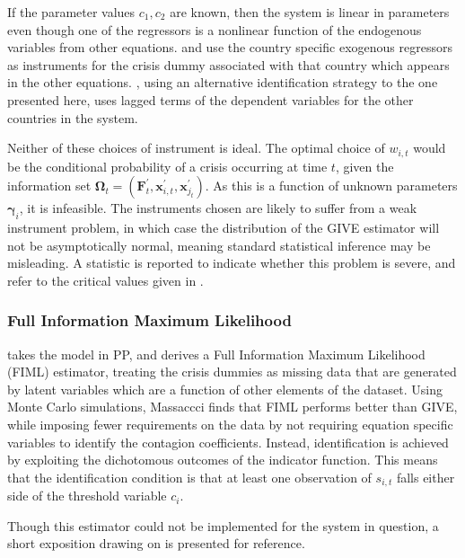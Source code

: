 \documentclass[../base.tex]{subfiles}
\begin{document}
If the parameter values $c_1, c_2$ are known, then the system is linear in parameters even though one of the regressors is a nonlinear function of the endogenous variables from other equations. \cite{pesaran2007econometric} and \cite{massacci2007identification} use the country specific exogenous regressors as instruments for the crisis dummy associated with that country which appears in the other equations. \cite{metiu2012sovereign}, using an alternative identification strategy to the one presented here, uses lagged terms of the dependent variables for the other countries in the system. 

Neither of these choices of instrument is ideal. The optimal choice of $w_{i,t}$ would be the conditional probability of a crisis occurring at time $t$, given the information set $\boldsymbol{\Omega}_t = (\mathbf{F}_t^\prime, \mathbf{x}_{i,t}^{\prime}, \mathbf{x}_{j_t}^{\prime})$. As this is a function of unknown parameters $\boldsymbol{\gamma}_i$, it is infeasible. The instruments chosen are likely to suffer from a weak instrument problem, in which case the distribution of the GIVE estimator will not be asymptotically normal, meaning standard statistical inference may be misleading. A \cite{cragg1993testing} statistic is reported to indicate whether this problem is severe, and refer to the critical values given in \cite{stock2005testing}.

\subsubsection{Full Information Maximum Likelihood}
\label{fiml}

\cite{massacci2007identification} takes the model in PP, and derives a Full Information Maximum Likelihood (FIML) estimator, treating the crisis dummies as missing data that are generated by latent variables which are a function of other elements of the dataset. Using Monte Carlo simulations, Massaccci finds that FIML performs better than GIVE, while imposing fewer requirements on the data by not requiring equation specific variables to identify the contagion coefficients. Instead, identification is achieved by exploiting the dichotomous outcomes of the indicator function. This means that the identification condition is that at least one observation of $s_{i,t}$ falls either side of the threshold variable $c_i$. 

Though this estimator could not be implemented for the system in question, a short exposition drawing on \cite{massacci2007identification} is presented for reference. 
\end{document}
